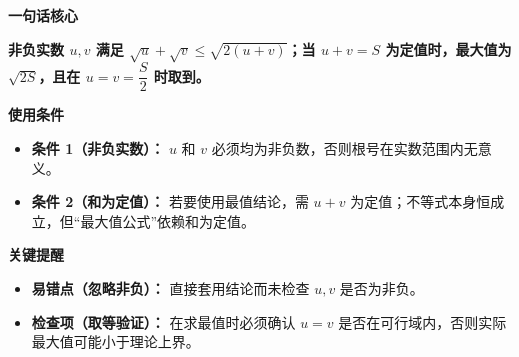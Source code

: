\begin{summarybox}
	\textbf{\textcolor{CSummary}{一句话核心}}

	\textbf{非负实数 $u,v$ 满足 $\sqrt{u}+\sqrt{v} \le \sqrt{2(u+v)}$；当 $u+v=S$ 为定值时，最大值为 $\sqrt{2S}$，且在 $u=v=\dfrac{S}{2}$ 时取到。}

	\medskip
	\textbf{\textcolor{CSummary}{使用条件}}

	\begin{itemize}[leftmargin=*, itemsep=0.5em, topsep=0.4em]
		\item \textbf{条件 1（非负实数）：} $u$ 和 $v$ 必须均为非负数，否则根号在实数范围内无意义。
		\item \textbf{条件 2（和为定值）：} 若要使用最值结论，需 $u+v$ 为定值；不等式本身恒成立，但“最大值公式”依赖和为定值。
	\end{itemize}

	\medskip
	\textbf{\textcolor{CSummary}{关键提醒}}

	\begin{itemize}[leftmargin=*, itemsep=0.5em, topsep=0.4em]
		\item \textbf{易错点（忽略非负）：} 直接套用结论而未检查 $u,v$ 是否为非负。
		\item \textbf{检查项（取等验证）：} 在求最值时必须确认 $u=v$ 是否在可行域内，否则实际最大值可能小于理论上界。
	\end{itemize}
\end{summarybox}